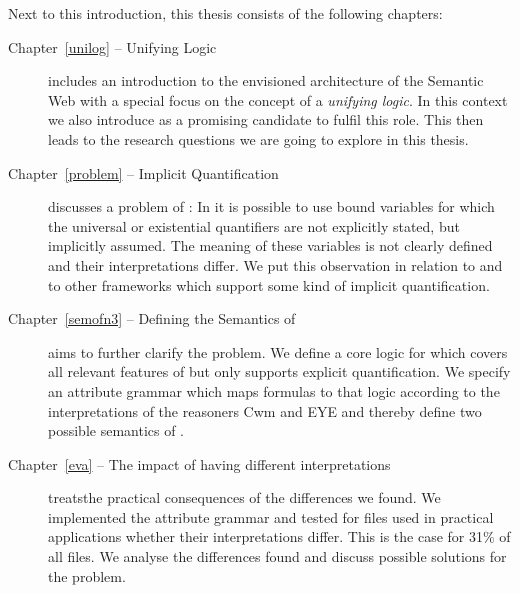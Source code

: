Next to this introduction, this thesis consists of the following chapters:

\begin{description}
\item[Chapter~\ref{unilog} -- Unifying Logic]
includes an introduction to the envisioned  architecture of the Semantic Web with a special focus 
on the concept of a \emph{unifying logic}. In this context we also introduce \nthreelogic as a promising candidate to fulfil this role.
This then leads to the research questions we are going to explore in this thesis.

\item[Chapter~\ref{problem} -- Implicit Quantification] discusses 
a problem of \nthreelogic:
In  \nthree it is possible to
use bound variables for which the universal or existential quantifiers are not explicitly stated,
but implicitly assumed. 
The meaning of these variables is not clearly defined and their interpretations differ. 
We put this observation in relation to \rdf and to other 
frameworks which support some kind of implicit quantification.

\item[Chapter~\ref{semofn3} -- Defining the Semantics of \nthreelogic]
aims to further clarify the problem.
We define a core logic for \nthreelogic which covers
all relevant features of \nthree but only supports
explicit quantification. 
We specify an attribute grammar which maps \nthree formulas to that logic according to the interpretations of the reasoners Cwm and EYE 
and thereby define two possible
semantics of \nthree.


\item[Chapter~\ref{eva} -- The impact of having different \nthree interpretations]
treats\linebreak the practical consequences of the differences we found. We implemented the attribute grammar and tested for 
files used in practical applications whether their interpretations differ. This is the case for 31\% of all files.
We analyse the differences found and discuss possible solutions for the problem.
% 


\end{description}
